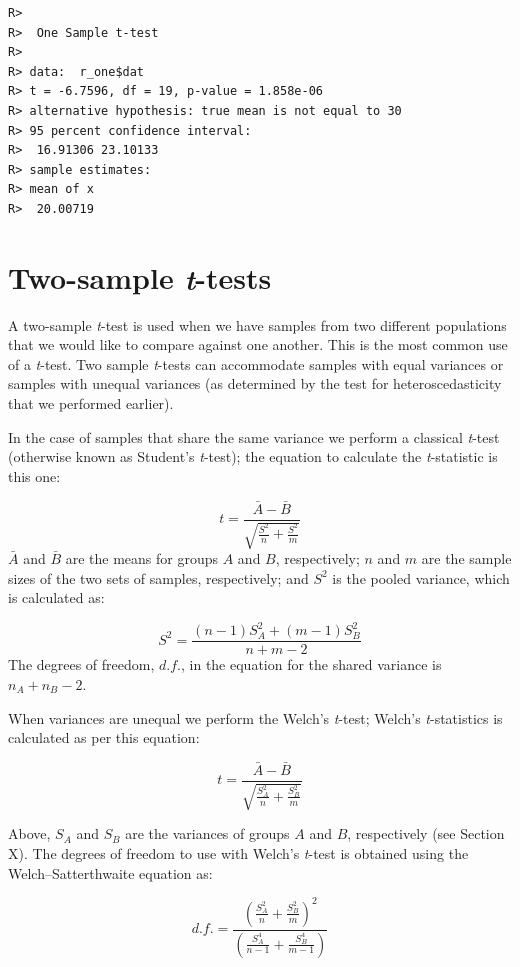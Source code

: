 \documentclass[english,10pt,a4paper,oneside]{book}
\theoremstyle{definition}
\theoremstyle{definition}
\theoremstyle{definition}
\theoremstyle{remark}
\begin{document}
\begin{verbatim}
R> 
R>  One Sample t-test
R> 
R> data:  r_one$dat
R> t = -6.7596, df = 19, p-value = 1.858e-06
R> alternative hypothesis: true mean is not equal to 30
R> 95 percent confidence interval:
R>  16.91306 23.10133
R> sample estimates:
R> mean of x 
R>  20.00719
\end{verbatim}

\section{\texorpdfstring{Two-sample
\emph{t}-tests}{Two-sample t-tests}}\label{two-sample-t-tests}

A two-sample \emph{t}-test is used when we have samples from two
different populations that we would like to compare against one another.
This is the most common use of a \emph{t}-test. Two sample
\emph{t}-tests can accommodate samples with equal variances or samples
with unequal variances (as determined by the test for heteroscedasticity
that we performed earlier).

In the case of samples that share the same variance we perform a
classical \emph{t}-test (otherwise known as Student's \emph{t}-test);
the equation to calculate the \emph{t}-statistic is this one:

\[t=\frac{\bar{A}-\bar{B}}{\sqrt{\frac{S^{2}}{n}+\frac{S^{2}}{m}}}\]
\(\bar{A}\) and \(\bar{B}\) are the means for groups \(A\) and \(B\),
respectively; \(n\) and \(m\) are the sample sizes of the two sets of
samples, respectively; and \(S^{2}\) is the pooled variance, which is
calculated as:

\[S^{2}=\frac{(n-1)S_{A}^{2}+(m-1)S_{B}^{2} }{n+m-2}\] The degrees of
freedom, \(d.f.\), in the equation for the shared variance is
\(n_{A}+n_{B}-2\).

When variances are unequal we perform the Welch's \emph{t}-test; Welch's
\emph{t}-statistics is calculated as per this equation:

\[t=\frac{\bar{A}-\bar{B}}{\sqrt{\frac{S^{2}_{A}}{n}+\frac{S^{2}_{B}}{m}}}\]

Above, \(S_{A}\) and \(S_{B}\) are the variances of groups \(A\) and
\(B\), respectively (see Section X). The degrees of freedom to use with
Welch's \emph{t}-test is obtained using the Welch--Satterthwaite
equation as:

\[d.f. = \frac{\left( \frac{S^{2}_{A}}{n}+\frac{S^{2}_{B}}{m} \right)^{2}}{\left( \frac{S^{4}_{A}}{n-1} + \frac{S^{4}_{B}}{m-1} \right)}\]
\end{document}
